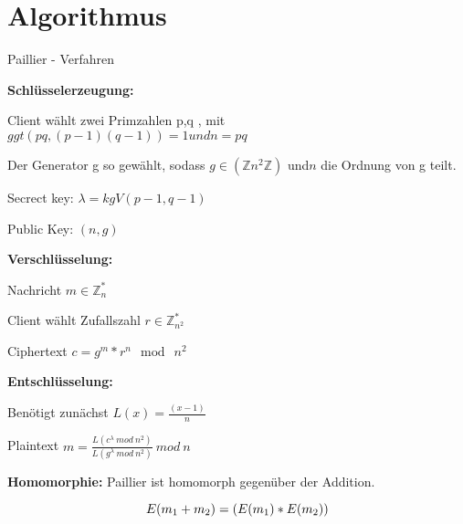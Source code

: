 \documentclass{beamer}
\begin{document}



\section{Algorithmus}


\begin{frame}{Paillier - Verfahren}

	\textbf{Schlüsselerzeugung:}\\
	
	\begin{arrowlist}
	\item Client wählt zwei Primzahlen p,q , mit $ ggt(pq, (p-1)(q-1))= 1 und n =pq $  
	\item Der Generator g so gewählt, sodass $ g \in (\mathbb{Z} n^{2} \mathbb{Z}) $ und$ n $ die Ordnung von g teilt.	
	\item Secrect key: $ \lambda = kgV(p-1, q-1) $
	\item Public Key: $(n,g)$	
	\end{arrowlist}
	
	

\end{frame}

\begin{frame}
		\textbf{Verschlüsselung:}
		\begin{arrowlist}
			\item Nachricht  $ m \in \mathbb{Z}_{n}^{*} $
			\item Client wählt Zufallszahl $ r  \in \mathbb{Z}_{n^{2}}^{*} $ 
			\item Ciphertext $ c = g^{m}*r^{n} \mod\ n^{2} $
		\end{arrowlist}
		

		\textbf{Entschlüsselung:}
		\begin{arrowlist}
			\item Benötigt zunächst $ L(x)= \frac{(x-1)}{n} $
			\item Plaintext $ m = \frac{L(c^{\lambda} \ mod \ n^{2}) }{L(g^{\lambda} \ mod \ n^{2})} \ mod \ n $
		\end{arrowlist}


		\textbf{Homomorphie:}
		Paillier ist homomorph gegenüber der Addition.
		
		$$ E(m \textsubscript{1} + m \textsubscript{2}) = (E(m \textsubscript{1}) * E(m \textsubscript{2}))$$
\end{frame}
\end{document}
